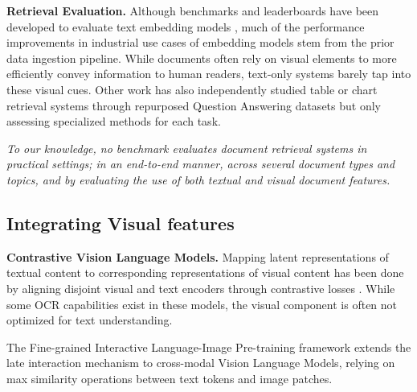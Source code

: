 \documentclass{article} %
\begin{document}

\noindent\textbf{Retrieval Evaluation.}
Although benchmarks and leaderboards have been developed to evaluate text embedding models \citep{thakur_beir_2021, muennighoff_mteb_2022}, much of the performance improvements in industrial use cases of embedding models stem from the prior data ingestion pipeline. While documents often rely on visual elements to more efficiently convey information to human readers, text-only systems barely tap into these visual cues. Other work has also independently studied table or chart retrieval systems through repurposed Question Answering datasets \citep{Zhang_2019, nowak-etal-2024-multimodal} but only assessing specialized methods for each task.

\noindent\textit{To our knowledge, no benchmark evaluates document retrieval systems in practical settings; in an end-to-end manner, across several document types and topics, and by evaluating the use of both textual and visual document features.}



\subsection{Integrating Visual features}

\noindent\textbf{Contrastive Vision Language Models.}
Mapping latent representations of textual content to corresponding representations of visual content has been done by aligning disjoint visual and text encoders through contrastive losses \citep{radford_learning_2021, zhai_sigmoid_2023}. While some OCR capabilities exist in these models, the visual component is often not optimized for text understanding. 

The Fine-grained Interactive Language-Image Pre-training \citep{yao_filip_2021} framework extends the late interaction mechanism to cross-modal Vision Language Models, relying on max similarity operations between text tokens and image patches.
\end{document}
